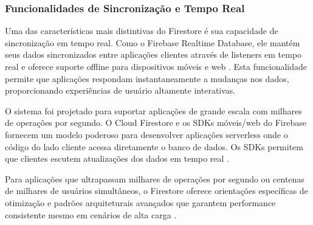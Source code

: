 \begin{comment}
O Firebase Firestore constitui-se como um banco de dados NoSQL (Not Only SQL) orientado a documentos, desenvolvido e mantido pela Google como componente central do ecossistema Firebase \cite{google2023firestore}. Esta solução de armazenamento fundamenta-se em uma arquitetura distribuída e escalável, projetada especificamente para atender às demandas de aplicações móveis e web modernas que requerem sincronização de dados em tempo real entre múltiplos clientes e dispositivos \cite{chang2008bigtable}.

A arquitetura do Firestore baseia-se no modelo de dados orientado a documentos, onde as informações são organizadas em estruturas hierárquicas compostas por coleções e documentos \cite{mongodb2023nosql}. Cada documento representa uma unidade de dados estruturada em formato JSON, contendo pares chave-valor que podem incluir tipos primitivos, arrays, objetos aninhados e referências a outros documentos. Esta flexibilidade estrutural permite a modelagem eficiente de dados complexos sem as restrições impostas pelos esquemas rígidos dos bancos de dados relacionais tradicionais.

\end{comment}

\subsubsection{Funcionalidades de Sincronização e Tempo Real}

Uma das características mais distintivas do Firestore é sua capacidade de sincronização em tempo real. Como o Firebase Realtime Database, ele mantém seus dados sincronizados entre aplicações clientes através de listeners em tempo real e oferece suporte offline para dispositivos móveis e web \cite{firebase_choose_database}. Esta funcionalidade permite que aplicações respondam instantaneamente a mudanças nos dados, proporcionando experiências de usuário altamente interativas.

O sistema foi projetado para suportar aplicações de grande escala com milhares de operações por segundo. O Cloud Firestore e os SDKs móveis/web do Firebase fornecem um modelo poderoso para desenvolver aplicações serverless onde o código do lado cliente acessa diretamente o banco de dados. Os SDKs permitem que clientes escutem atualizações dos dados em tempo real \cite{firebase_firestore_docs}.

Para aplicações que ultrapassam milhares de operações por segundo ou centenas de milhares de usuários simultâneos, o Firestore oferece orientações específicas de otimização e padrões arquiteturais avançados que garantem performance consistente mesmo em cenários de alta carga \cite{firebase_realtime_scale}.

